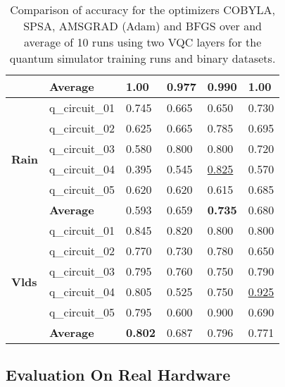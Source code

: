 \begin{table}[!h]
\begin{tabular}{p{}p{}|p{}p{}p{}p{}}
		\cline{2-6} 
		                        & \textbf{Average}      & \textbf{1.00}  & 0.977 & 0.990   & \textbf{1.00} \\
		\hline 
		\multirow{6}{*}{\textbf{Rain}}   & q\_circuit\_01 & 0.745  & 0.665 & 0.650   & 0.730 \\
		                        & q\_circuit\_02 & 0.625  & 0.665 & 0.785   & 0.695 \\
		                        & q\_circuit\_03 & 0.580 & 0.800 & 0.800  & 0.720 \\
		                        & q\_circuit\_04 & 0.395  & 0.545 & \underline{0.825}   & 0.570 \\
		                        & q\_circuit\_05 & 0.620 & 0.620 & 0.615   & 0.685 \\
		\cline{2-6} 
		                        & \textbf{Average}      & 0.593  & 0.659 & \textbf{0.735}   & 0.680 \\
		\hline 
		\multirow{6}{*}{\textbf{Vlds}}   & q\_circuit\_01 & 0.845  & 0.820 & 0.800   & 0.800 \\
		                        & q\_circuit\_02 & 0.770  & 0.730 & 0.780   & 0.650 \\
		                        & q\_circuit\_03 & 0.795  & 0.760 & 0.750   & 0.790 \\
		                        & q\_circuit\_04 & 0.805  & 0.525 & 0.750   & \underline{0.925} \\
		                        & q\_circuit\_05 & 0.795  & 0.600 & 0.900   & 0.690 \\
		\cline{2-6} 
		                        & \textbf{Average}      & \textbf{0.802}  & 0.687 & 0.796   & 0.771 \\
		\hline
	\end{tabular}
	\caption{Comparison of accuracy for the optimizers COBYLA, SPSA, AMSGRAD (Adam) and BFGS over and average of 10 runs using two VQC layers for the quantum simulator training runs and binary datasets.}
	\label{table:accuracy_comparison_binary_dataset_and_optimizers_training_runs}
\end{table}


\subsection{Evaluation On Real Hardware}

